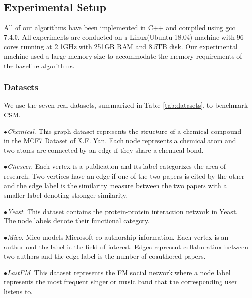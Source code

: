 \subsection{Experimental Setup}
\label{sec:setup}
All of our algorithms have been implemented in C++ and compiled using gcc 7.4.0. All experiments are conducted on a Linux(Ubuntu 18.04) machine with 96 cores running at 2.1GHz with 251GB RAM and 8.5TB disk. Our experimental machine used a large memory size to accommodate the memory requirements of the baseline algorithms. %

\subsubsection{Datasets} 
\label{ref:datasets}

We use the seven real datasets, summarized in Table \ref{tab:datasets}, to benchmark CSM.

$\bullet${\textit{Chemical}\cite{}}. This graph dataset represents the structure of a chemical compound in the MCF7 Dataset of X.F. Yan\cite{YH02}.%
Each node represents a chemical atom and two atoms are connected by an edge if they share a chemical bond.

$\bullet${\textit{Citeseer}\cite{}}. Each vertex is a publication and its label categorizes the area of research. Two vertices have an edge if one of the two papers is cited by the other and the edge label is the similarity measure between the two papers with a smaller label denoting stronger similarity. %

$\bullet${\textit{Yeast}\cite{}}. This dataset contains the protein-protein interaction network in Yeast. The node labels denote their functional category.%

$\bullet${\textit{Mico}\cite{}}. Mico models Microsoft co-authorship information. Each vertex is an author and the label is the field of interest. Edges represent collaboration between two authors and the edge label is the number of coauthored papers. %

$\bullet${\textit{LastFM}\cite{}}. This dataset represents the FM social network where a node label represents the most frequent singer or music band that the corresponding user listens to. %

